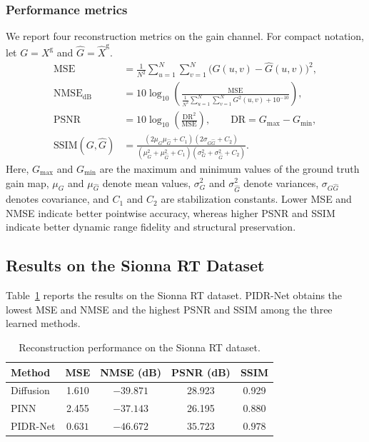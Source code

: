 \documentclass[lettersize,journal]{IEEEtran}
\begin{document}
\subsubsection{Performance metrics}
We report four reconstruction metrics on the gain channel. For compact notation, let $G=X^{\mathrm g}$ and $\widehat{G}=\widehat{X}^{\mathrm g}$.
\begingroup
\small
\begin{align}
	\mathrm{MSE}
	&= \frac{1}{N^2}\sum_{u=1}^{N}\sum_{v=1}^{N}
	\big(G(u,v)-\widehat{G}(u,v)\big)^2, \\
	\mathrm{NMSE}_{\mathrm{dB}}
	&= 10\log_{10}\!\left(
	\frac{\mathrm{MSE}}
	{\frac{1}{N^2}\sum_{u=1}^{N}\sum_{v=1}^{N} G^2(u,v)+10^{-10}}
	\right), \\
	\mathrm{PSNR}
	&= 10\log_{10}\!\left(\frac{\mathrm{DR}^2}{\mathrm{MSE}}\right), 
	\qquad \mathrm{DR}=G_{\max}-G_{\min}, \\
	\mathrm{SSIM}(G,\widehat{G})
	&=
	\frac{(2\mu_G\mu_{\widehat{G}}+C_1)(2\sigma_{G\widehat{G}}+C_2)}
	{(\mu_G^2+\mu_{\widehat{G}}^2+C_1)(\sigma_G^2+\sigma_{\widehat{G}}^2+C_2)}.
	\label{eq:ssim_metric}
\end{align}
\endgroup
Here, $G_{\max}$ and $G_{\min}$ are the maximum and minimum values of the ground truth gain map, $\mu_G$ and $\mu_{\widehat{G}}$ denote mean values, $\sigma_G^2$ and $\sigma_{\widehat{G}}^2$ denote variances, $\sigma_{G\widehat{G}}$ denotes covariance, and $C_1$ and $C_2$ are stabilization constants. Lower MSE and NMSE indicate better pointwise accuracy, whereas higher PSNR and SSIM indicate better dynamic range fidelity and structural preservation.

\subsection{Results on the Sionna RT Dataset}

Table~\ref{tab:rt_main_results} reports the results on the Sionna RT dataset. PIDR-Net obtains the lowest MSE and NMSE and the highest PSNR and SSIM among the three learned methods.

\begin{table}[t]
\caption{Reconstruction performance on the Sionna RT dataset.}
\label{tab:rt_main_results}
\centering
\small
\begin{tabular}{lcccc}
\toprule
Method & MSE & NMSE (dB) & PSNR (dB) & SSIM \\
\midrule
Diffusion & 1.610 & $-39.871$ & 28.923 & 0.929 \\
PINN & 2.455 & $-37.143$ & 26.195 & 0.880 \\
PIDR-Net & $\boldsymbol{0.631}$ & $\boldsymbol{-46.672}$ & $\boldsymbol{35.723}$ & $\boldsymbol{0.978}$ \\
\bottomrule
\end{tabular}
\end{table}
\end{document}
